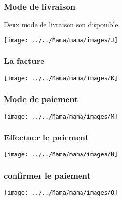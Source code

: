 \subsubsection*{Mode de livraison}
Deux mode de livraison son disponible 

\begin{minipage}[c]{.45\textwidth}
	\begin{center}
	\texttt{[image: ../../Mama/mama/images/J]}
\end{center}
\end{minipage}

\subsubsection*{La facture}
\begin{minipage}[c]{.45\textwidth}
	\begin{center}
	\texttt{[image: ../../Mama/mama/images/K]}
\end{center}
\end{minipage}


\subsubsection*{Mode de paiement}
\begin{minipage}[c]{.45\textwidth}
	\begin{center}
	\texttt{[image: ../../Mama/mama/images/M]}
\end{center}
\end{minipage}

\subsubsection{Effectuer le paiement}
\begin{minipage}[c]{.45\textwidth}
	\begin{center}
	\texttt{[image: ../../Mama/mama/images/N]}
\end{center}
\end{minipage}	

\subsubsection{confirmer le paiement }
\begin{minipage}[c]{.5\textwidth}
	\begin{center}
	\texttt{[image: ../../Mama/mama/images/O]}
\end{center}
\end{minipage}
